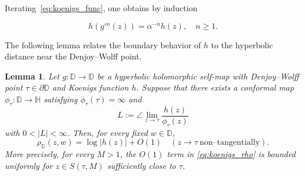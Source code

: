 \documentclass[12pt]{amsart}
\numberwithin{equation}{section}
\theoremstyle{plain}
\newtheorem{lemma}[equation]{Lemma}
\theoremstyle{definition}
\begin{document}
Iterating~\eqref{eq:koenigs_func}, one obtains by induction

\begin{equation*}
h(g^{\circ n}(z))
=
\alpha^{-n}h(z),
\quad n\ge1.
\end{equation*}



The following lemma relates the boundary behavior of $h$ to the hyperbolic distance near the Denjoy--Wolff point.

\begin{lemma}
\label{lem:koenigs_metric}
Let $g:\mathbb{D}\to\mathbb{D}$ be a hyperbolic holomorphic
self-map with Denjoy--Wolff point $\tau\in\partial\mathbb{D}$ and
Koenigs function $h$. Suppose that there exists a conformal map
$\phi_\tau:\mathbb{D}\to\mathbb{H}$ satisfying
$\phi_\tau(\tau)=\infty$ and
\begin{equation*}
\label{eq:koenigs_angular}
L:=\angle\lim_{z\to\tau}
\frac{h(z)}{\phi_\tau(z)}
\end{equation*}
with $0<|L|<\infty$. Then, for every fixed $w\in\mathbb{D}$,
\begin{equation}
\label{eq:koenigs_rho}
\rho_{\mathbb{D}}(z,w)
=
\log|h(z)|+O(1)
\quad
(z\to\tau\ \text{non--tangentially}).
\end{equation}
More precisely, for every $M>1$, the $O(1)$ term in
\eqref{eq:koenigs_rho} is bounded uniformly for
$z\in S(\tau,M)$ sufficiently close to $\tau$.
\end{lemma}
\end{document}
